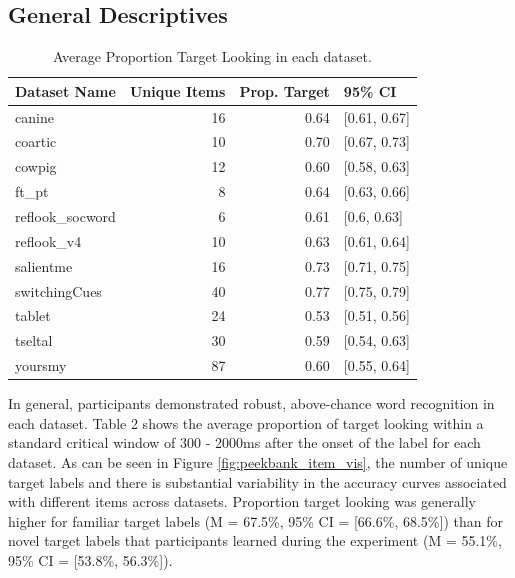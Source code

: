 \documentclass[10pt, letterpaper]{article}
\begin{document}
\hypertarget{general-descriptives}{%
\subsection{General Descriptives}\label{general-descriptives}}

\begin{table}[H]
\centering
\begingroup\fontsize{9pt}{10pt}\selectfont
\begin{tabular}{lrrl}
  \hline
Dataset Name & Unique Items & Prop. Target & 95\% CI \\ 
  \hline
canine & 16 & 0.64 & [0.61, 0.67] \\ 
  coartic & 10 & 0.70 & [0.67, 0.73] \\ 
  cowpig & 12 & 0.60 & [0.58, 0.63] \\ 
  ft\_pt & 8 & 0.64 & [0.63, 0.66] \\ 
  reflook\_socword & 6 & 0.61 & [0.6, 0.63] \\ 
  reflook\_v4 & 10 & 0.63 & [0.61, 0.64] \\ 
  salientme & 16 & 0.73 & [0.71, 0.75] \\ 
  switchingCues & 40 & 0.77 & [0.75, 0.79] \\ 
  tablet & 24 & 0.53 & [0.51, 0.56] \\ 
  tseltal & 30 & 0.59 & [0.54, 0.63] \\ 
  yoursmy & 87 & 0.60 & [0.55, 0.64] \\ 
   \hline
\end{tabular}
\endgroup
\caption{Average Proportion Target Looking in each dataset.} 
\end{table}

In general, participants demonstrated robust, above-chance word
recognition in each dataset. Table 2 shows the average proportion of
target looking within a standard critical window of 300 - 2000ms after
the onset of the label for each dataset. As can be seen in Figure
\ref{fig:peekbank_item_vis}, the number of unique target labels and
there is substantial variability in the accuracy curves associated with
different items across datasets. Proportion target looking was generally
higher for familiar target labels (M = 67.5\%, 95\% CI = {[}66.6\%,
68.5\%{]}) than for novel target labels that participants learned during
the experiment (M = 55.1\%, 95\% CI = {[}53.8\%, 56.3\%{]}).
\end{document}
